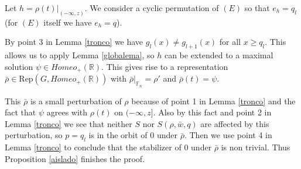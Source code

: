 \documentclass[12pt]{article}
\newcommand{\F}{\mathbb{F}}
\newcommand{\R}{\mathbb{R}}
\theoremstyle{definition}
\begin{document}
Let $h=\rho(t)|_{(-\infty,z)}$.  We consider a cyclic permutation of $(E)$ so that $e_h=q_l$ (for $(E)$ itself we have $e_h=q$).

By point 3 in Lemma \ref{tronco} we have $g_l(x)\neq g_{l+1}(x)$ for all $x\geq q_l$. This allows us to apply Lemma \ref{globalema}, so $h$ can be extended to a maximal solution $\psi\in Homeo_{+}(\R)$. This gives rise to a representation $\bar \rho \in\text{Rep}(G,Homeo_{+}(\R))$ with $\bar \rho|_{\F_n}=\rho'$ and $\bar \rho(t)=\psi$. 

This $\bar\rho$ is a small perturbation of $\rho$ because of point 1 in Lemma \ref{tronco} and the fact that $\psi$ agrees with $\rho(t)$ on $(-\infty,z]$. Also by this fact and point 2 in Lemma  \ref{tronco} we see that neither $S$ nor $S(\rho,\bar w,q)$ are affected by this perturbation, so $p=q_l$ is in the orbit of $0$ under $\bar\rho$. Then we use point 4 in Lemma \ref{tronco} to conclude that the stabilizer of $0$ under $\bar\rho$ is non trivial. Thus Proposition \ref{aislado} finishes the proof.
  
\end{document}

